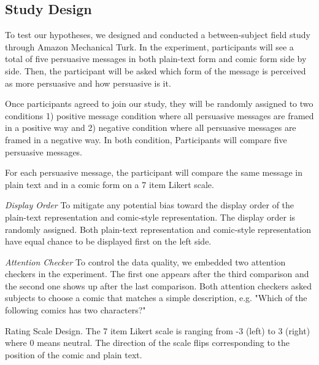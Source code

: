 \subsection{Study Design}
To test our hypotheses, we designed and conducted a between-subject field study through Amazon Mechanical Turk. In the experiment, participants will see a total of five persuasive messages in both plain-text form and comic form side by side. Then, the participant will be asked which form of the message is perceived as more persuasive and how persuasive is it.\par
Once participants agreed to join our study, they will be randomly assigned to two conditions 1) positive message condition where all persuasive messages are framed in a positive way and 2) negative condition where all persuasive messages are framed in a negative way. In both condition, Participants will compare five persuasive messages.\par
For each persuasive message, the participant will compare the same message in plain text and in a comic form on a 7 item Likert scale. \par
\textit{Display Order} To mitigate any potential bias toward the display order of the plain-text representation and comic-style representation. The display order is randomly assigned. Both plain-text representation and comic-style representation have equal chance to be displayed first on the left side.\par
\textit{Attention Checker} To control the data quality, we embedded two attention checkers in the experiment. The first one appears after the third comparison and the second one shows up after the last comparison. Both attention checkers asked subjects to choose a comic that matches a simple description, e.g. "Which of the following comics has two characters?"\par
Rating Scale Design. The 7 item Likert scale is ranging from -3 (left) to 3 (right) where 0 means neutral. The direction of the scale flips corresponding to the position of the comic and plain text. \par
